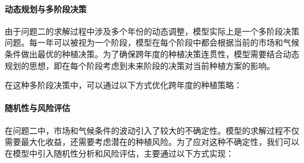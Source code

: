 \documentclass[12pt,a4paper]{nmmcm}
\begin{document}
\paragraph{动态规划与多阶段决策}

由于问题二的求解过程中涉及多个年份的动态调整，模型实际上是一个多阶段决策问题。每一年可以被视为一个阶段，模型在每个阶段中都会根据当前的市场和气候条件做出最优的种植决策。为了确保跨年度的种植决策连贯性，模型需要结合动态规划的思想，即在每个阶段考虑到未来阶段的决策对当前种植方案的影响。

在这种多阶段决策中，可以通过以下方式优化跨年度的种植策略：

    
    


\paragraph{随机性与风险评估}

在问题二中，市场和气候条件的波动引入了较大的不确定性。模型的求解过程不仅需要最大化收益，还需要考虑潜在的种植风险。为了应对这种不确定性，我们可以在模型中引入随机性分析和风险评估，主要通过以下方式实现：
\end{document}
